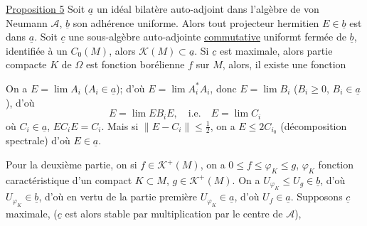 \uline{Proposition 5} Soit $\underline a$ un idéal bilatère auto-adjoint dans l'algèbre de von Neumann $\mathcal A$, $\underline b$ son adhérence uniforme. Alors tout projecteur hermitien $E\in\underline b$ est dans $\underline a$.  Soit $\underline c$ une sous-algèbre auto-adjointe \uline{commutative} uniformt fermée de $\underline b$, identifiée à un $C_0(M)$, alors  $\mathcal K(M)\subset\underline a$. Si $\underline c$ est maximale, alors  partie compacte $K$ de $\Omega$ est   fonction borélienne    $f$ sur $M$, alors, il existe une fonction    

On a $E=\lim A_i$ ($A_i\in\underline a$); d'où $E=\lim A_i^*A_i$, donc $E=\lim B_i$ ($B_i\geq0$, $B_i\in\underline a$), d'où
\[
E=\lim EB_iE,\quad\text{i.e.}\quad E=\lim C_i
\]
où $C_i\in\underline a$, $EC_iE=C_i$.  Mais si $\|E-C_i\|\leq\frac12$, on a $E\leq2C_{i_0}$ (décomposition spectrale) d'où $E\in\underline a$.


Pour la deuxième partie, on   si $f\in\mathcal K^+(M)$, on a $0\leq f\leq\varphi_K\leq g$, $\varphi_K$ fonction caractéristique d'un compact $K\subset M$, $g\in\mathcal K^+(M)$. On a $U_{\varphi_K}\leq U_g\in\underline b$, d'où $U_{\varphi_K}\in\underline b$, d'où en vertu de la partie première $U_{\varphi_K}\in\underline a$, d'où $U_f\in\underline a$. Supposons $\underline c$ maximale, ($\underline c$ est alors stable par multiplication par le centre de $\mathcal A$), 
